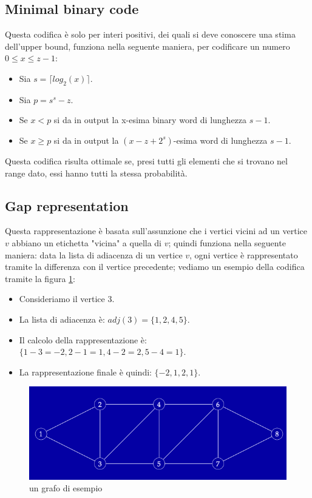 \documentclass[12pt,a4paper]{article}
\begin{document}
\subsection{Minimal binary code}
Questa codifica è solo per interi positivi, dei quali si deve conoscere una stima dell'upper bound, funziona nella seguente maniera, per codificare un numero $0 \leq x \leq z - 1$:
\begin{itemize}
\item Sia $s = \lceil log_{2} (x) \rceil$.
\item Sia $p = s^s - z$.
\item Se $x < p$ si da in output la x-esima binary word di lunghezza $s - 1$.
\item Se $x \geq p$ si da in output la $(x - z + 2^s)$-esima word di lunghezza $s - 1$.
\end{itemize}
Questa codifica risulta ottimale se, presi tutti gli elementi che si trovano nel range dato, essi hanno tutti la stessa probabilità.

\subsection{Gap representation}
Questa rappresentazione è basata sull'assunzione che i vertici vicini ad un vertice $v$ abbiano un etichetta "vicina" a quella di $v$; quindi funziona nella seguente maniera: data la lista di adiacenza di un vertice $v$, ogni vertice è rappresentato tramite la differenza con il vertice precedente; vediamo un esempio della codifica tramite la figura \ref{fig:gap_repr}:
\begin{itemize}
\item Consideriamo il vertice 3.
\item La lista di adiacenza è: $adj(3) = \lbrace 1, 2, 4, 5 \rbrace$.
\item Il calcolo della rappresentazione è: $\lbrace 1-3=-2, 2-1=1, 4-2=2, 5-4=1 \rbrace$.
\item La rappresentazione finale è quindi: $\lbrace -2, 1, 2, 1 \rbrace$.
\end{itemize}

\begin{figure}[h]
	\centering
	\includegraphics[width=0.8\linewidth]{img/gap_repr}
	\caption{un grafo di esempio}
	\label{fig:gap_repr}
\end{figure}
\end{document}
